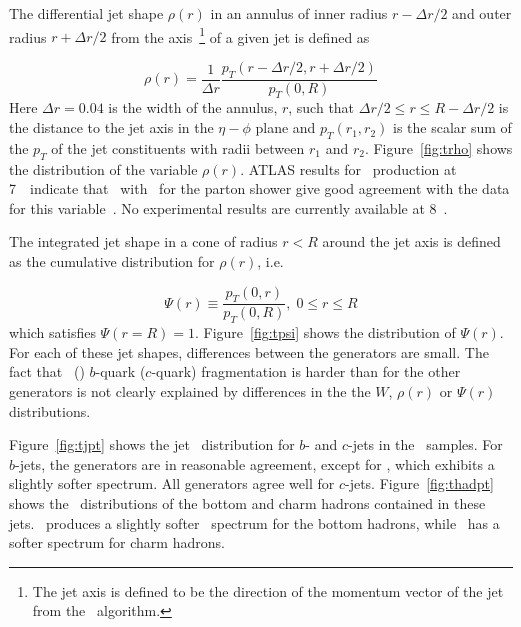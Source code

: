 The differential jet shape $\rho (r)$ in an annulus of inner radius $r-\Delta r /2$ and outer radius $r+\Delta r /2$ from the axis~\footnote{The jet axis is defined to be the direction of the momentum vector of the jet from the \antiktfour\ algorithm.} of a given jet is defined as

$$
\rho(r) = \frac{1}{\Delta r} \frac{p_T \left(r-\Delta r /2, r+\Delta r /2 \right)}{p_T \left(0, R \right)}
$$ 
\noindent
Here $\Delta r = 0.04$ is the width of the annulus, $r$, such that $\Delta r /2 \leq r \leq R - \Delta r /2$ is the distance to the jet axis in the $\eta-\phi$ plane and $p_T(r_1, r_2)$ is the scalar sum of the $p_T$ of the jet constituents with radii between $r_1$ and $r_2$. Figure~\ref{fig:trho} shows the distribution of the variable $\rho(r)$. 
ATLAS results for \ttbar\ production at 7~\TeV\ indicate that \PowHeg\ with \Pythia\ for the parton shower give
good agreement with the data for this variable~\cite{Aad:2013fba}. No experimental results are currently available at 8~\TeV.

The integrated jet shape in a cone of radius $r<R$ around the jet axis is defined as the cumulative distribution for $\rho(r)$, i.e.

$$
\Psi(r) \equiv \frac{p_T \left(0, r \right)}{p_T \left(0, R \right)},\; 0 \leq r \leq R 
$$
\noindent
which satisfies $\Psi(r = R) = 1$.
Figure~\ref{fig:tpsi} shows the distribution of $\Psi(r)$. For each of these jet shapes, differences between the 
generators are small. The fact that \Herwigpp\ (\Herwig) $b$-quark ($c$-quark) fragmentation is harder than for the other generators is not clearly explained by differences in the the $W$, $\rho(r)$ or $\Psi(r)$ distributions.

Figure~\ref{fig:tjpt} shows the jet \pT\ distribution for $b$- and  $c$-jets in the \ttbar\ samples.
For $b$-jets, the generators are in reasonable agreement, except for \Herwigpp, which exhibits a slightly softer
spectrum.  All generators agree well for $c$-jets.  Figure~\ref{fig:thadpt} shows the \pT\ distributions
of the bottom and charm hadrons contained in these jets.  \Herwigpp\ produces a slightly
softer \pT\ spectrum for the bottom hadrons, while \Herwig\ has a softer spectrum for charm hadrons.  

